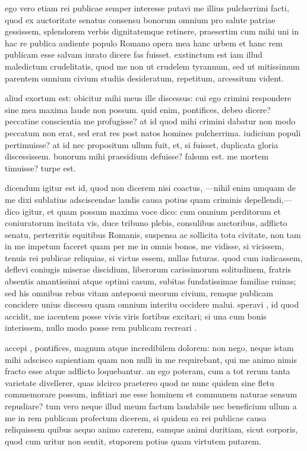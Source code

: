  ego vero etiam rei publicae semper interesse putavi me illius pulcherrimi facti, quod ex auctoritate senatus consensu bonorum omnium pro salute patriae gessissem, splendorem verbis dignitatemque retinere, praesertim cum mihi uni in hac re publica audiente populo Romano opera mea hanc urbem et hanc rem publicam esse salvam iurato dicere fas fuisset. exstinctum est iam illud maledictum crudelitatis, quod me non ut crudelem tyrannum, sed ut mitissimum parentem omnium civium studiis desideratum, repetitum, arcessitum vident.

 aliud exortum est: obicitur mihi meus ille discessus: cui ego crimini respondere sine mea maxima laude non possum. quid enim, pontifices, debeo dicere? peccatine conscientia me profugisse? at id quod mihi crimini dabatur non modo peccatum non erat, sed erat res post natos homines pulcherrima. iudicium populi pertimuisse? at id nec propositum ullum fuit, et, si fuisset, duplicata gloria discessissem. bonorum mihi praesidium defuisse? falsum est. me mortem timuisse? turpe est.

 dicendum igitur est id, quod non dicerem nisi coactus, —nihil enim umquam de me dixi sublatius adsciscendae laudis causa potius quam criminis depellendi,—dico igitur, et quam possum maxima voce dico: cum omnium perditorum et coniuratorum incitata vis, duce tribuno plebis, consulibus auctoribus, adflicto senatu, perterritis equitibus Romanis, suspensa ac sollicita tota civitate, non tam in me impetum faceret quam per me in omnis bonos, me vidisse, si vicissem, tenuis rei publicae reliquias, si victus essem, nullas futuras. quod cum iudicassem, deflevi coniugis miserae discidium, liberorum carissimorum solitudinem, fratris absentis amantissimi atque optimi casum, subitas fundatissimae familiae ruinas; sed his omnibus rebus vitam anteposui meorum civium, remque publicam concidere unius discessu quam omnium interitu occidere malui. speravi , id quod accidit, me iacentem posse vivis viris fortibus excitari; si una cum bonis interissem, nullo modo posse rem publicam recreari .

 accepi , pontifices, magnum atque incredibilem dolorem: non nego, neque istam mihi adscisco sapientiam quam non nulli in me requirebant, qui me animo nimis fracto esse atque adflicto loquebantur. an ego poteram, cum a tot rerum tanta varietate divellerer, quas idcirco praetereo quod ne nunc quidem sine fletu commemorare possum, infitiari me esse hominem et communem naturae sensum repudiare? tum vero neque illud meum factum laudabile nec beneficium ullum a me in rem publicam profectum dicerem, si quidem ea rei publicae causa reliquissem quibus aequo animo carerem, eamque animi duritiam, sicut corporis, quod cum uritur non sentit, stuporem potius quam virtutem putarem.

